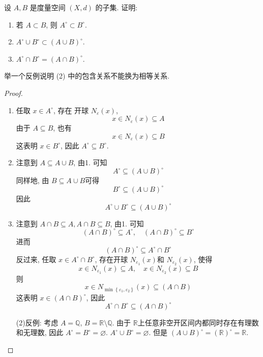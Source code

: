 \documentclass[../main.tex]{subfiles}
\begin{document}
\begin{exercise}{}{}
设 $A, B$ 是度量空间 $(X,d)$ 的子集. 证明:
\begin{enumerate}
    \item 若 $A \subset B$, 则 $A^\circ \subset B^\circ$.
    \item $A^\circ \cup B^\circ \subset (A \cup B)^\circ$.
    \item $A^\circ \cap B^\circ = (A \cap B)^\circ$.
\end{enumerate}
举一个反例说明 (2) 中的包含关系不能换为相等关系.
\end{exercise}
\begin{proof}
    \begin{enumerate}
        \item 任取 \(  x \in A^{\circ}  \), 存在 开球 \(  N_{ \varepsilon }\left( x \right)   \), \[
        x \in N_{ \varepsilon }\left( x \right)\subseteq A 
        \] 由于 \(  A\subseteq B  \), 也有 \[
        x \in N_{ \varepsilon }\left( x \right)\subseteq B 
        \]这表明 \(  x \in B^{\circ }  \), 因此 \(  A^{\circ }\subseteq B^{\circ}   \).
        \item 注意到 \(  A\subseteq A\cup B  \), 由1. 可知 \[
        A^{\circ }\subseteq \left( A\cup B \right)^{\circ} 
        \] 同样地, 由 \(  B\subseteq A\cup B  \)可得 \[
        B^{\circ }\subseteq \left( A\cup B \right)^{\circ} 
        \]因此 \[
        A^{\circ }\cup B^{\circ }\subseteq \left( A\cup B \right)^{\circ} 
        \]
        \item 注意到 \(  A\cap B\subseteq A,  A\cap B\subseteq B  \), 由1. 可知 \[
        \left( A\cap B \right)^{\circ }\subseteq A^{\circ },\quad \left( A\cap B \right)^{\circ }\subseteq B^{\circ}  
        \]进而 \[
        \left( A\cap B \right)^{\circ }\subseteq A^{\circ }\cap B^{\circ} 
        \]   反过来, 任取 \(  x \in A^{\circ }\cap B^{\circ }  \), 存在开球 \(  N_{ \varepsilon _1 }\left( x \right)   \)和 \(  N_{ \varepsilon _2 }\left( x \right)   \), 使得 \[
         x\in N_{ \varepsilon _1 }\left( x \right)\subseteq A,\quad x \in N_{ \varepsilon _2 }\left( x \right)\subseteq B  
        \] 则 \[
         x\in N_{\min \left\{  \varepsilon _1 , \varepsilon _2  \right\}}\left( x \right)\subseteq \left( A\cap B \right)  
        \]这表明 \(  x \in \left( A\cap B \right)^{\circ }   \), 因此 \[
        A^{\circ}\cap B^{\circ}\subseteq \left( A\cap B \right)^{\circ} 
        \]   


        (2)反例: 考虑 \(  A= \mathbb{Q}   \), \(  B= \mathbb{R} \setminus \mathbb{Q}   \). 由于 \(  \mathbb{R}   \)上任意非空开区间内都同时存在有理数和无理数, 因此  \(  A^{\circ}= B^{\circ }= \varnothing  \).   \(  A^{\circ}\cup B^{\circ}= \varnothing  \). 但是 \(  \left( A\cup B \right)^{\circ}= \left( \mathbb{R}  \right)^{\circ}= \mathbb{R}     \).  
    \end{enumerate}
    
\end{proof}
\end{document}
